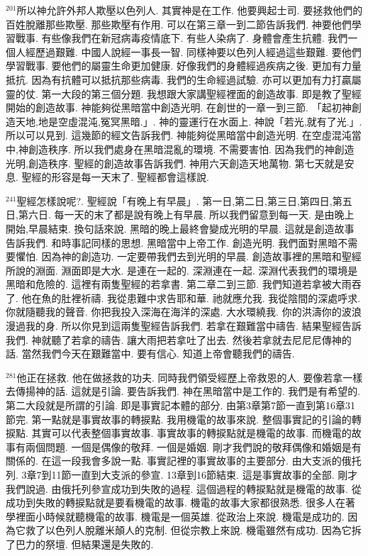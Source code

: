 \documentclass{book}
\begin{document}
$^{201}$所以神允許外邦人欺壓以色列人.
其實神是在工作.
他要興起士司.
要拯救他們的百姓脫離那些欺壓.
那些欺壓有作用.
可以在第三章一到二節告訴我們.
神要他們學習戰事.
有些像我們在新冠病毒疫情底下.
有些人染病了.
身體會產生抗體.
我們一個人經歷過艱難.
中國人說經一事長一智.
同樣神要以色列人經過這些艱難.
要他們學習戰事.
要他們的屬靈生命更加健康.
好像我們的身體經過疾病之後.
更加有力量抵抗.
因為有抗體可以抵抗那些病毒.
我們的生命經過試驗.
亦可以更加有力打贏屬靈的仗.
第一大段的第三個分題.
我想跟大家講聖經裡面的創造故事.
即是教了聖經開始的創造故事.
神能夠從黑暗當中創造光明.
在創世的一章一到三節.
「起初神創造天地,地是空虛混沌,冤冥黑暗.」.
神的靈運行在水面上.
神說「若光,就有了光.」.
所以可以見到.
這幾節的經文告訴我們.
神能夠從黑暗當中創造光明.
在空虛混沌當中,神創造秩序.
所以我們處身在黑暗混亂的環境.
不需要害怕.
因為我們的神創造光明,創造秩序.
聖經的創造故事告訴我們.
神用六天創造天地萬物.
第七天就是安息.
聖經的形容是每一天末了.
聖經都會這樣說.

$^{241}$聖經怎樣說呢?.
聖經說「有晚上有早晨」.
第一日,第二日,第三日,第四日,第五日,第六日.
每一天的末了都是說有晚上有早晨.
所以我們留意到每一天.
是由晚上開始,早晨結束.
換句話來說.
黑暗的晚上最終會變成光明的早晨.
這就是創造故事告訴我們.
和時事記同樣的思想.
黑暗當中上帝工作.
創造光明.
我們面對黑暗不需要懼怕.
因為神的創造功.
一定要帶我們去到光明的早晨.
創造故事裡的黑暗和聖經所說的淵面.
淵面即是大水.
是連在一起的.
深淵連在一起.
深淵代表我們的環境是黑暗和危險的.
這裡有兩隻聖經的若拿書.
第二章二到三節.
我們知道若拿被大雨吞了.
他在魚的肚裡祈禱.
我從患難中求告耶和華.
祂就應允我.
我從陰間的深處呼求.
你就隨聽我的聲音.
你把我投入深海在海洋的深處.
大水環繞我.
你的洪濤你的波浪漫過我的身.
所以你見到這兩隻聖經告訴我們.
若拿在艱難當中禱告.
結果聖經告訴我們.
神就聽了若拿的禱告.
讓大雨把若拿吐了出去.
然後若拿就去尼尼尼傳神的話.
當然我們今天在艱難當中.
要有信心.
知道上帝會聽我們的禱告.

$^{281}$他正在拯救.
他在做拯救的功夫.
同時我們領受經歷上帝救恩的人.
要像若拿一樣去傳揚神的話.
這就是引論.
要告訴我們.
神在黑暗當中是工作的.
我們是有希望的.
第二大段就是所謂的引論.
即是事實記本體的部分.
由第3章第7節一直到第16章31節完.
第一點就是事實故事的轉捩點.
我用機電的故事來說.
整個事實記的引論的轉捩點.
其實可以代表整個事實故事.
事實故事的轉捩點就是機電的故事.
而機電的故事有兩個問題.
一個是偶像的敬拜.
一個是婚姻.
剛才我們說的敬拜偶像和婚姻是有關係的.
在這一段我會多說一點.
事實記裡的事實故事的主要部分.
由大支派的俄托列.
3章7到11節一直到大支派的參宣.
13章到16節結束.
這是事實故事的全部.
剛才我們說過.
由俄托列參宣成功到失敗的過程.
這個過程的轉捩點就是機電的故事.
從成功到失敗的轉捩點就是要看機電的故事.
機電的故事大家都很熟悉.
很多人在著學裡面小時候就聽機電的故事.
機電是一個英雄.
從政治上來說.
機電是成功的.
因為它救了以色列人脫離米顛人的克制.
但從宗教上來說.
機電雖然有成功.
因為它拆了巴力的祭壇.
但結果還是失敗的.
\end{document}
